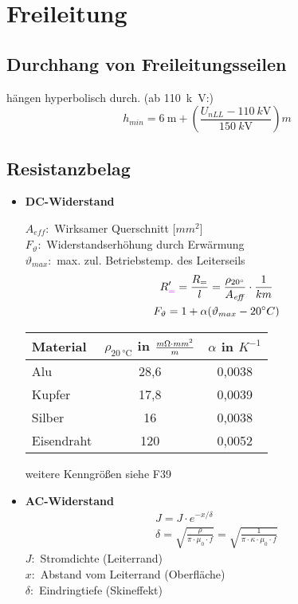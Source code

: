 \section{Freileitung}
\subsection{Durchhang von Freileitungsseilen}
hängen hyperbolisch durch. (ab \SI{110}{k\volt}:)
\begin{equation*}
    h_{min} = \SI{6}{\metre} + \left(\frac{U_{\mathit{nLL}} - \SI{110}{k\volt}}{\SI{150}{k\volt}}\right)m
\end{equation*}
\subsection{Resistanzbelag}
\begin{itemize}
\item[]{\textbf{DC-Widerstand}}

$A_{\mathit{eff}}:$ Wirksamer Querschnitt [$mm^2$]\\
$F_{\vartheta}:$ Widerstandserhöhung durch Erwärmung\\
$\vartheta_{max}:$ max. zul. Betriebstemp. des Leiterseils
\begin{gather*}
    R_{\textcolor{purple}{=}}' = \frac{R_{=}}{l} = \frac{\rho_{20 \degree}}{A_{\mathit{eff}}}\cdot\frac{1}{km}\\
    F_{\vartheta} = 1 + \alpha (\vartheta_{max} - 20\degree C)
\end{gather*}

\begin{table}[h]
\centering
\begin{tabular}[h]{|l|c|c|}
    \hline
    Material & $\rho_{\SI{20}{\degreeCelsius}}$ in $\frac{m\ohm \cdot mm^2}{m}$ & $\alpha$ in $K^{-1}$ \\
    \hline
    Alu & 28,6 & 0,0038 \\
    \hline
    Kupfer & 17,8 & 0,0039 \\
    \hline
    Silber & 16 & 0,0038 \\
    \hline
    Eisendraht & 120 & 0,0052 \\
    \hline
\end{tabular}
\end{table}
weitere Kenngrößen siehe F39\\

\item[]{\textbf{AC-Widerstand}}
\begin{gather*}
    J = J \cdot e^{-x/\delta}\\
    \delta = \sqrt{ \frac{\rho}{\pi \cdot \mu_{0} \cdot f}}
     = \sqrt{ \frac{1}{\pi \cdot \kappa \cdot \mu_{0} \cdot f}}
\end{gather*}
$J:$ Stromdichte (Leiterrand)\\
$x:$ Abstand vom Leiterrand (Oberfläche)\\
$\delta:$ Eindringtiefe (Skineffekt)\\


\end{itemize}
